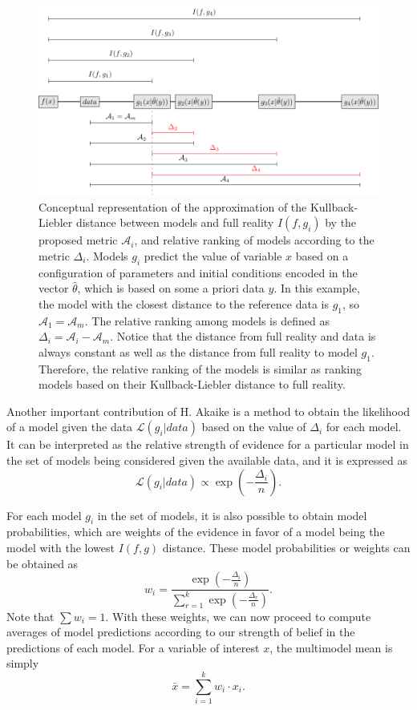 \documentclass[gmd, manuscript]{copernicus}
\begin{document}
\begin{figure}[ht]
   \centering
   \includegraphics[width=14cm]{Figures/distances.pdf} %
   \caption{Conceptual representation of the approximation of the Kullback-Liebler distance between models and full reality $I(f, g_i)$ by the proposed metric $\mathcal{A}_i$, and relative ranking of models according to the metric $\Delta_i$. Models $g_i$ predict the value of variable $x$ based on a configuration of parameters and initial conditions encoded in the vector $\hat{\theta}$, which is based on some a priori data $y$. In this example, the model with the closest distance to the reference data is $g_1$, so $\mathcal{A}_1 = \mathcal{A}_m$. The relative ranking among models is defined as $\Delta_i = \mathcal{A}_i - \mathcal{A}_m$. Notice that the distance from full reality and data is always constant as well as the distance from full reality to model $g_1$. Therefore, the relative ranking of the models is similar as ranking models based on their Kullback-Liebler distance to full reality.}
   \label{fig:concept}
\end{figure}

Another important contribution of H. Akaike is a method to obtain the likelihood of a model given the data $\mathcal{L}(g_i | data)$ based on the value of $\Delta_i$ for each model. It can be interpreted as the relative strength of evidence for a particular model in the set of models being considered given the available data, and it is expressed as
\begin{equation}
\mathcal{L}(g_i | data) \varpropto \exp \left( - \frac{ \Delta_i}{n} \right).
\end{equation}

For each model $g_i$ in the set of models, it is also possible to obtain model probabilities, which are weights of the evidence in favor of a model being the model with the lowest $I(f, g)$ distance. These model probabilities or weights can be obtained as
\begin{equation}
w_i = \frac{\exp (-\frac{\Delta_i}{n})}{\sum_{r=1}^k \exp(- \frac{\Delta_r}{n})}.
\end{equation}
Note that $\sum w_i =1$. 
With these weights, we can now proceed to compute averages of model predictions according to our strength of belief in the predictions of each model. 
For a variable of interest $x$, the multimodel mean is simply
\begin{equation}
\bar{x} = \sum_{i=1}^k w_i \cdot x_i.
\end{equation}
\end{document}
